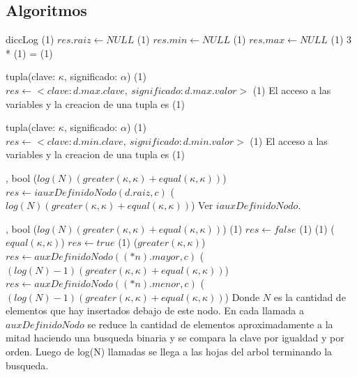 \subsection{Algoritmos}

{}
{diccLog}
{\bigo(1)}
{   \State $res.raiz \gets NULL$                \comment \bigo(1)
    \State $res.min \gets NULL$                 \comment \bigo(1)
    \State $res.max \gets NULL$                 \comment \bigo(1)
}{3 * \bigo(1) = \bigo(1)}


{   
}
{tupla(clave: $\kappa$, significado: $\alpha$)}
{\bigo(1)}
{   \State $res \gets <clave: d.max.clave,\ significado: d.max.valor>$    \comment \bigo(1)
}{El acceso a las variables y la creacion de una tupla es \bigo(1)}


{   
}
{tupla(clave: $\kappa$, significado: $\alpha$)}
{\bigo(1)}
{   \State $res \gets <clave: d.min.clave,\ significado: d.min.valor>$    \comment \bigo(1)
}{El acceso a las variables y la creacion de una tupla es \bigo(1)}


{   ,
    }
{bool}
{\bigo($log(N)(greater(\kappa, \kappa)+equal(\kappa, \kappa))$)}
{   \State $res \gets iauxDefinidoNodo(d.raiz, c)$          \comment \bigo($log(N)(greater(\kappa, \kappa)+equal(\kappa, \kappa))$)
}{Ver $iauxDefinidoNodo$.}

{   ,
    }
{bool}
{\bigo($log(N)(greater(\kappa, \kappa)+equal(\kappa, \kappa))$)}
{                                                        \comment \bigo(1)
        \State $res \gets false$                                        \comment \bigo(1)
    \Else                                                               \comment \bigo(1)
                                                   \comment \bigo($equal(\kappa, \kappa)$)
            \State $res \gets true$                                     \comment \bigo(1)
        \Else
                                                   \comment \bigo($greater(\kappa, \kappa)$)
                \State $res \gets auxDefinidoNodo((*n).mayor, c)$      \comment \bigo($(log(N)-1)(greater(\kappa, \kappa)+equal(\kappa, \kappa))$)
            \Else
                \State $res \gets auxDefinidoNodo((*n).menor, c)$      \comment \bigo($(log(N)-1)(greater(\kappa, \kappa)+equal(\kappa, \kappa))$)
            \EndIf
        \EndIf
    \EndIf
}{  Donde $N$ es la cantidad de elementos que hay insertados debajo de este nodo. 
    En cada llamada a $auxDefinidoNodo$ se reduce la cantidad de elementos aproximadamente a la mitad 
    haciendo una busqueda binaria y se compara la clave por igualdad y por orden. 
    Luego de log(N) llamadas se llega a las hojas del arbol terminando la busqueda. }



